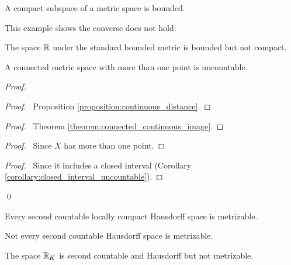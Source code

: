 \begin{proposition}
    \label{proposition:bounded_compact}
    A compact subspace of a metric space is bounded.
\end{proposition}

This example shows the converse does not hold:

\begin{example}
    The space $\mathbb{R}$ under the standard bounded metric is bounded but not compact.
\end{example}

\begin{proposition}
    A connected metric space with more than one point is uncountable.
\end{proposition}

\begin{proof}
    \pf
    \begin{proof}
        \pf\ Proposition \ref{proposition:continuous_distance}.
    \end{proof}
    \begin{proof}
        \pf\ Theorem \ref{theorem:connected_continuous_image}.
    \end{proof}
    \begin{proof}
        \pf\ Since $X$ has more than one point.
    \end{proof}
    \begin{proof}
        \pf\ Since it includes a closed interval (Corollary \ref{corollary:closed_interval_uncountable}).
    \end{proof}
    \qed
\end{proof}

\begin{corollary}
    Every second countable locally compact Hausdorff space is metrizable.
\end{corollary}

\begin{example}
    Not every second countable Hausdorff space is metrizable.

    The space $\mathbb{R}_K$ is second countable and Hausdorff but not metrizable.
\end{example}

